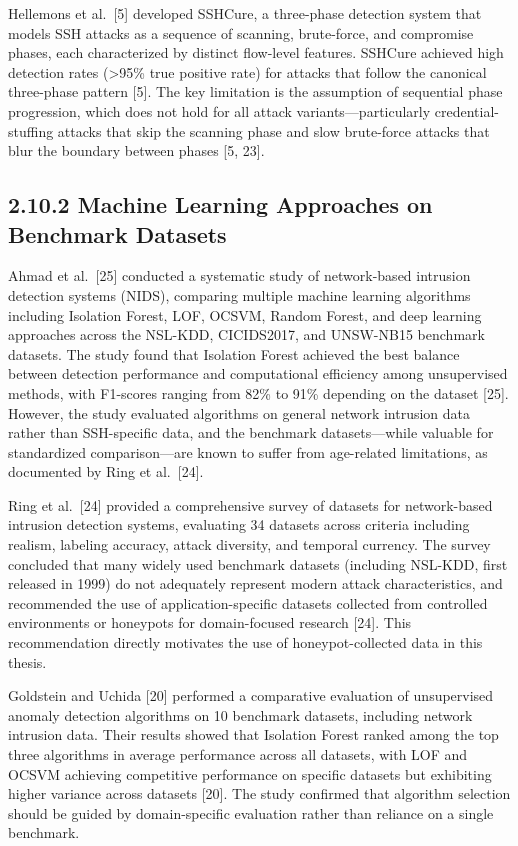 \documentclass[
  a4paper]{report}
\begin{document}
Hellemons et al.~{[}5{]} developed SSHCure, a three-phase detection
system that models SSH attacks as a sequence of scanning, brute-force,
and compromise phases, each characterized by distinct flow-level
features. SSHCure achieved high detection rates (\textgreater95\% true
positive rate) for attacks that follow the canonical three-phase pattern
{[}5{]}. The key limitation is the assumption of sequential phase
progression, which does not hold for all attack variants---particularly
credential-stuffing attacks that skip the scanning phase and slow
brute-force attacks that blur the boundary between phases {[}5, 23{]}.

\subsection{2.10.2 Machine Learning Approaches on Benchmark
Datasets}\label{machine-learning-approaches-on-benchmark-datasets}

Ahmad et al.~{[}25{]} conducted a systematic study of network-based
intrusion detection systems (NIDS), comparing multiple machine learning
algorithms including Isolation Forest, LOF, OCSVM, Random Forest, and
deep learning approaches across the NSL-KDD, CICIDS2017, and UNSW-NB15
benchmark datasets. The study found that Isolation Forest achieved the
best balance between detection performance and computational efficiency
among unsupervised methods, with F1-scores ranging from 82\% to 91\%
depending on the dataset {[}25{]}. However, the study evaluated
algorithms on general network intrusion data rather than SSH-specific
data, and the benchmark datasets---while valuable for standardized
comparison---are known to suffer from age-related limitations, as
documented by Ring et al.~{[}24{]}.

Ring et al.~{[}24{]} provided a comprehensive survey of datasets for
network-based intrusion detection systems, evaluating 34 datasets across
criteria including realism, labeling accuracy, attack diversity, and
temporal currency. The survey concluded that many widely used benchmark
datasets (including NSL-KDD, first released in 1999) do not adequately
represent modern attack characteristics, and recommended the use of
application-specific datasets collected from controlled environments or
honeypots for domain-focused research {[}24{]}. This recommendation
directly motivates the use of honeypot-collected data in this thesis.

Goldstein and Uchida {[}20{]} performed a comparative evaluation of
unsupervised anomaly detection algorithms on 10 benchmark datasets,
including network intrusion data. Their results showed that Isolation
Forest ranked among the top three algorithms in average performance
across all datasets, with LOF and OCSVM achieving competitive
performance on specific datasets but exhibiting higher variance across
datasets {[}20{]}. The study confirmed that algorithm selection should
be guided by domain-specific evaluation rather than reliance on a single
benchmark.
\end{document}
